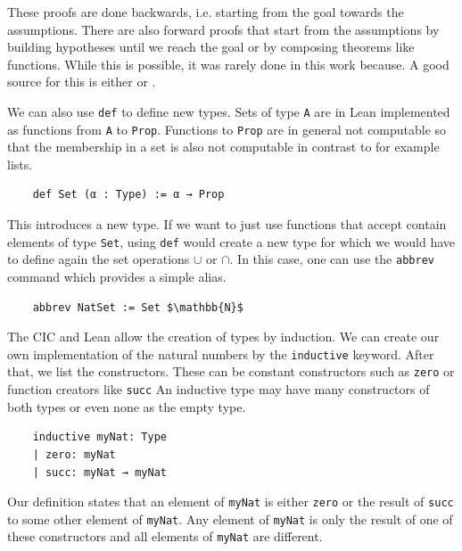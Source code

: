 These proofs are done backwards, i.e. starting from the goal towards the assumptions. There are also forward proofs that start from the assumptions by building hypotheses until we reach the goal or by composing theorems like functions. While this is possible, it was rarely done in this work because. A good source for this is either \cite{theoremProvingLean} or \cite{HitchhikerLogicVer}.



We can also use \lstinline|def| to define new types. Sets of type \lstinline|A| are in Lean implemented as functions from \lstinline|A| to \lstinline|Prop|. Functions to \lstinline|Prop| are in general not computable so that the membership in a set is also not computable in contrast to for example lists.

\begin{lstlisting}
    def Set (α : Type) := α → Prop
\end{lstlisting}

This introduces a new type. If we want to just use functions that accept contain elements of type \lstinline|Set|, using \lstinline|def| would create a new type for which we would have to define again the set operations $\cup$ or $\cap$. In this case, one can use the \lstinline|abbrev| command which provides a simple alias.

\begin{lstlisting}
    abbrev NatSet := Set $\mathbb{N}$
\end{lstlisting}

The CIC and Lean allow the creation of types by induction. We can create our own implementation of the natural numbers by the \lstinline|inductive| keyword. After that, we list the constructors. These can be constant constructors such as \lstinline|zero| or function creators like \lstinline|succ|
An inductive type may have many constructors of both types or even none as the empty type.

\begin{lstlisting}
    inductive myNat: Type
    | zero: myNat
    | succ: myNat → myNat
\end{lstlisting}

Our definition states that an element of \lstinline|myNat| is either \lstinline|zero| or the result of \lstinline|succ| to some other element of \lstinline|myNat|. Any element of \lstinline|myNat| is only the result of one of these constructors and all elements of \lstinline|myNat| are different.

